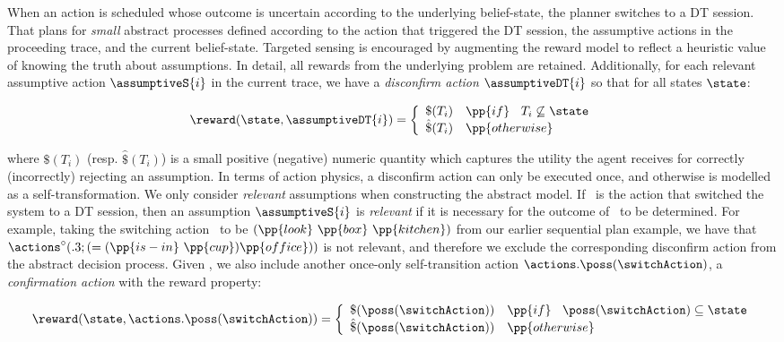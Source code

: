 When an action is scheduled whose outcome is uncertain according to
the underlying belief-state, the planner switches to a DT
session. That plans for {\em small} abstract processes defined
according to the action that triggered the DT session, the assumptive
actions in the proceeding trace, and the current
belief-state. Targeted sensing is encouraged by augmenting the reward
model to reflect a heuristic value of knowing the truth about
assumptions. In detail, all rewards from the underlying problem are
retained. Additionally, for each relevant assumptive action
$\assumptiveS{i}$ in the current trace, we have a {\em disconfirm
action} $\assumptiveDT{i}$ so that for all states $\state$:

\vspace{-1ex}
\small
\[
\reward(\state, \assumptiveDT{i}) = \bigg\{ \begin{array}{ll}
\$(T_i) & \pp{if}~\;\;T_i \not\subseteq \state \\
\hat\$(T_i) & \pp{otherwise} \\
\end{array}
\]
\normalsize

\vspace{-1ex}

\noindent where $\$(T_i)$ (resp. $\hat\$(T_i)$) is a small positive
(negative) numeric quantity which captures the utility the agent
receives for correctly (incorrectly) rejecting an assumption.  In
terms of action physics, a disconfirm action can only be executed
once, and otherwise is modelled as a self-transformation.  We only
consider {\em relevant} assumptions when constructing the abstract
model.  If \switchAction\ is the action that switched the system to a
DT session, then an assumption $\assumptiveS{i}$ is {\em relevant} if
it is necessary for the outcome of \switchAction\ to be
determined. For example, taking the switching action \switchAction\ to
be $(\pp{look}~\pp{box}~\pp{kitchen})$ from our earlier sequential
plan example, we have that
$\actions^{\circ}(.3;(=(\pp{is-in}~\pp{cup})\pp{office}))$ is not
relevant, and therefore we exclude the corresponding disconfirm action
from the abstract decision process. Given \switchAction, we also
include another once-only self-transition action
$\actions.\poss(\switchAction)$, a \emph{confirmation action} with the
reward property:

\[
\reward(\state, \actions.\poss(\switchAction)) = \bigg\{ \begin{array}{ll}
\$(\poss(\switchAction)) & \pp{if}~\;\; \poss(\switchAction) \subseteq \state \\
\hat\$(\poss(\switchAction)) & \pp{otherwise} \\
\end{array}
\]

